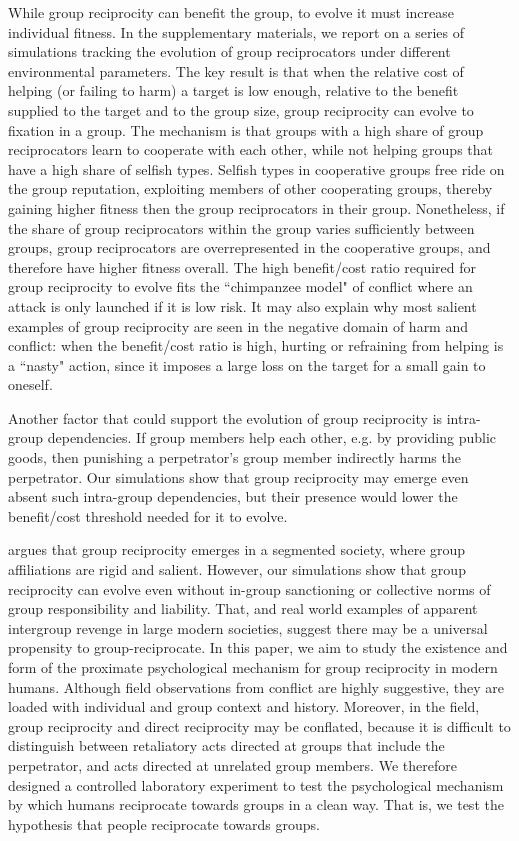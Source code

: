 \documentclass[12pt,a4paper]{article}\usepackage[]{graphicx}\usepackage[]{color}
\begin{document}
While group reciprocity can benefit the group, to evolve it must increase individual fitness. In the
supplementary materials, we report on a series of simulations tracking the evolution of group reciprocators under different
environmental parameters. The key result is that when the relative cost of helping (or failing to harm) a target is low
enough, relative to the benefit supplied to the target and to the group size, group reciprocity can evolve to fixation in a group. The mechanism is that groups
with a high share of group
reciprocators learn to cooperate with each other, while not helping groups that have a high share of selfish types.
Selfish types in cooperative groups free ride on the group reputation,
exploiting members of other cooperating groups, thereby gaining higher fitness then the group reciprocators in their group.
Nonetheless, if the share of group reciprocators within the group varies sufficiently between groups, group reciprocators
are overrepresented in the cooperative groups, and therefore have higher fitness overall. The high benefit/cost ratio required for
group reciprocity to evolve fits the ``chimpanzee model" of conflict where an attack is
only launched if it is low risk. It may also explain why most salient examples of group reciprocity are seen in the
negative domain of harm and conflict: when the benefit/cost ratio is high, hurting or refraining from helping is a ``nasty" action,
since it imposes a large loss on the target for a small gain to oneself.

Another factor that could support the evolution of group reciprocity is intra-group dependencies. If group members help
each other, e.g. by providing public goods, then punishing a perpetrator's group member indirectly harms the perpetrator.
Our simulations show that group reciprocity may emerge even absent such intra-group dependencies, but their presence
would lower the benefit/cost threshold needed for it to evolve.

\citet{kelly2000warless} argues that group reciprocity emerges in a segmented society, where group affiliations are rigid and salient.
However, our simulations show that group reciprocity can evolve even without in-group sanctioning or collective norms of
group responsibility and liability. That, and real world examples of apparent intergroup revenge in large modern societies,
suggest there may be a universal propensity to group-reciprocate. In this paper, we aim to study the existence and form of the proximate
psychological mechanism for group reciprocity in modern humans. Although field observations from conflict are highly
suggestive, they are loaded with individual and group context and history. Moreover, in the field, group
reciprocity and direct reciprocity may be conflated, because
it is difficult to distinguish between retaliatory acts directed at groups that include the perpetrator, and acts
directed at unrelated group members. We therefore designed a controlled laboratory experiment to test the psychological
mechanism by which humans reciprocate towards groups in a clean way. That is, we test the hypothesis that people
reciprocate towards groups.
\end{document}
